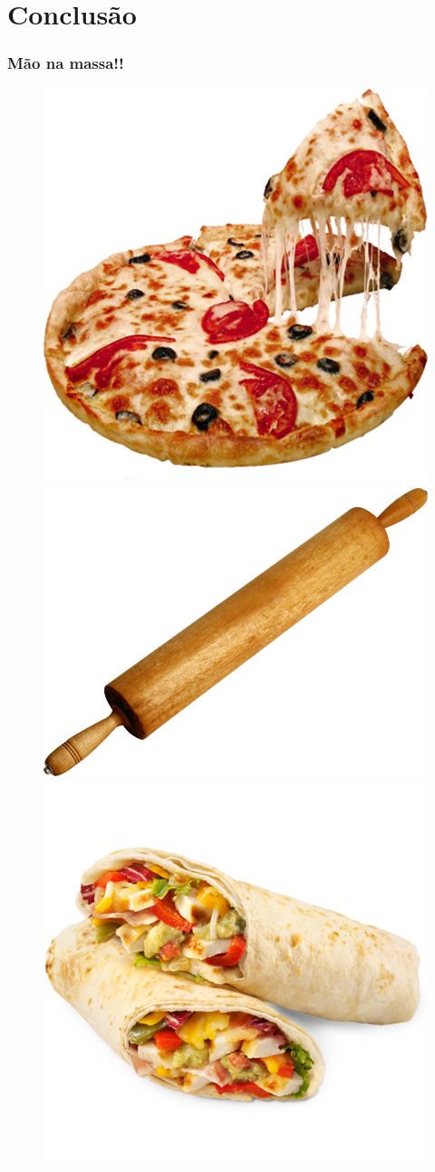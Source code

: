 \documentclass[12pt]{beamer}
\begin{document}
\section{Conclusão}
\begin{frame}
    \frametitle{Mão na massa!!}
    \begin{figure}
        \centering
        \includegraphics[width=.3\textwidth]{pizza.png}
        \includegraphics[width=.3\textwidth]{rolo.png}
        \includegraphics[width=.3\textwidth]{burrito.png}
    \end{figure}
\end{frame}
\end{document}
